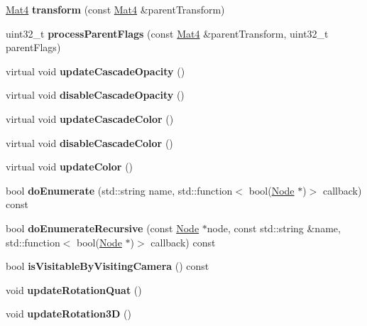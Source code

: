 \begin{DoxyCompactItemize}
\mbox{\label{classNode_ac2c42b42f83093c1c2eec1c85db42da3}} 
\hyperlink{classMat4}{Mat4} {\bfseries transform} (const \hyperlink{classMat4}{Mat4} \&parent\+Transform)
\item 
\mbox{\label{classNode_adafbbfd4c342d5b49900279af703fd6a}} 
uint32\+\_\+t {\bfseries process\+Parent\+Flags} (const \hyperlink{classMat4}{Mat4} \&parent\+Transform, uint32\+\_\+t parent\+Flags)
\item 
\mbox{\label{classNode_a56a76d0ee2dc2db818d7324d36f1c73a}} 
virtual void {\bfseries update\+Cascade\+Opacity} ()
\item 
\mbox{\label{classNode_aaf30953d1ec835bdf97f3664e898b34e}} 
virtual void {\bfseries disable\+Cascade\+Opacity} ()
\item 
\mbox{\label{classNode_a25760a40efdb967a826441b8b2661c3c}} 
virtual void {\bfseries update\+Cascade\+Color} ()
\item 
\mbox{\label{classNode_ae0b8d91cf7ef028fd3766783f1eae3fd}} 
virtual void {\bfseries disable\+Cascade\+Color} ()
\item 
\mbox{\label{classNode_a2704ff7c772030d210ffe5d7efce75a2}} 
virtual void {\bfseries update\+Color} ()
\item 
\mbox{\label{classNode_abc25589657cd89b6790ee1df8db05e48}} 
bool {\bfseries do\+Enumerate} (std\+::string name, std\+::function$<$ bool(\hyperlink{classNode}{Node} $\ast$)$>$ callback) const
\item 
\mbox{\label{classNode_ab02e31227d3de70ff6b1b58ebf25d39a}} 
bool {\bfseries do\+Enumerate\+Recursive} (const \hyperlink{classNode}{Node} $\ast$node, const std\+::string \&name, std\+::function$<$ bool(\hyperlink{classNode}{Node} $\ast$)$>$ callback) const
\item 
\mbox{\label{classNode_ac777c670caf6e0369cc07bd6ffd26292}} 
bool {\bfseries is\+Visitable\+By\+Visiting\+Camera} () const
\item 
\mbox{\label{classNode_aca86193f13f3d6c1772630b30e995681}} 
void {\bfseries update\+Rotation\+Quat} ()
\item 
\mbox{\label{classNode_a6837d39880dd37abab5ac55c1b0801f3}} 
void {\bfseries update\+Rotation3D} ()
\end{DoxyCompactItemize}
